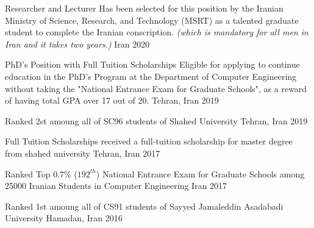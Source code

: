 


\begin{cvhonors}

  \cvhonor
    {Researcher and Lecturer} %
    {Has been selected for this position by the Iranian Ministry of Science, Research, and Technology (MSRT) as a talented graduate student to complete the Iranian conscription. \textit{(which is mandatory for all men in Iran and it takes two years.)}} %
    {Iran} %
    {2020} %
    
  \cvhonor
    {PhD's Position with Full Tuition Scholarships} %
    {Eligible for applying to continue education in the PhD's Program at the Department of Computer Engineering without taking the "National Entrance Exam for Graduate Schools", as a reward of having total GPA over 17 out of 20.} %
    {Tehran, Iran} %
    {2019} %
    
  \cvhonor
    {Ranked 2st} %
    {amoung all of SC96 students of Shahed University} %
    {Tehran, Iran} %
    {2019} %

  \cvhonor
    {Full Tuition Scholarships} %
    {received a full-tuition scholarship for master degree from shahed university} %
    {Tehran, Iran} %
    {2017} %
    
  \cvhonor
    {Ranked Top 0.7\% ($192^{th}$)} %
    {National Entrance Exam for Graduate Schools among 25000 Iranian Students in Computer Engineering} %
    {Iran} %
    {2017} %
    
  \cvhonor
    {Ranked 1st} %
    {amoung all of CS91 students of Sayyed Jamaleddin Asadabadi University} %
    {Hamadan, Iran} %
    {2016} %
    

\end{cvhonors}
